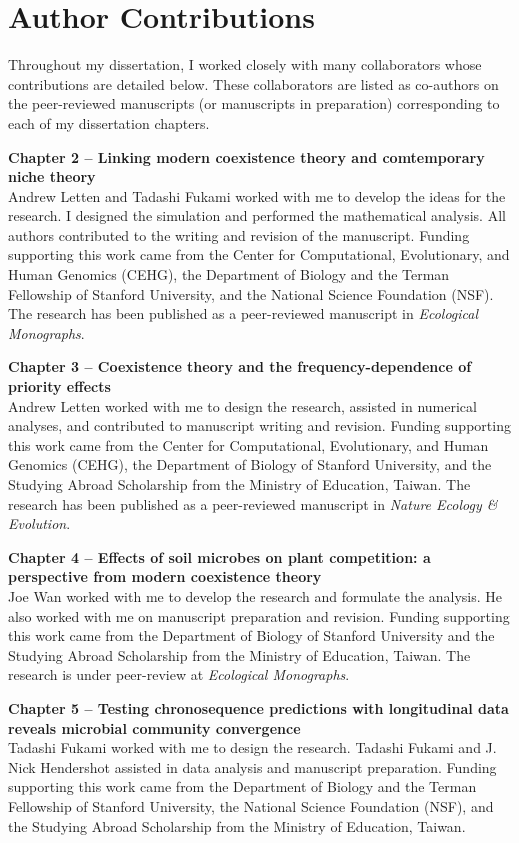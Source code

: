\section{Author Contributions}
Throughout my dissertation, I worked closely with many collaborators whose contributions are detailed below. These collaborators are listed as co-authors on the peer-reviewed manuscripts (or manuscripts in preparation) corresponding to each of my dissertation chapters.
\par


\noindent \textbf{Chapter 2 -- Linking modern coexistence theory and comtemporary niche theory}\\
\noindent Andrew Letten and Tadashi Fukami worked with me to develop the ideas for the research. I designed the simulation and performed the mathematical analysis. All authors contributed to the writing and revision of the manuscript. Funding supporting this work came from the Center for Computational, Evolutionary, and Human Genomics (CEHG), the Department of Biology and the Terman Fellowship of Stanford University, and the National Science Foundation (NSF). The research has been published as a peer-reviewed manuscript in \textit{Ecological Monographs}.
\bigskip


\noindent \textbf{Chapter 3 -- Coexistence theory and the frequency-dependence of priority effects}\\
\noindent Andrew Letten worked with me to design the research, assisted in numerical analyses, and contributed to manuscript writing and revision. Funding supporting this work came from the Center for Computational, Evolutionary, and Human Genomics (CEHG), the Department of Biology of Stanford University, and the Studying Abroad Scholarship from the Ministry of Education, Taiwan. The research has been published as a peer-reviewed manuscript in \textit{Nature Ecology \& Evolution}.
\bigskip


\noindent \textbf{Chapter 4 -- Effects of soil microbes on plant competition: a perspective from modern coexistence theory}\\
\noindent Joe Wan worked with me to develop the research and formulate the analysis. He also worked with me on manuscript preparation and revision. Funding supporting this work came from the Department of Biology of Stanford University and the Studying Abroad Scholarship from the Ministry of Education, Taiwan. The research is under peer-review at \textit{Ecological Monographs}.
\bigskip


\noindent \textbf{Chapter 5 -- Testing chronosequence predictions with longitudinal data reveals microbial community convergence}\\
\noindent Tadashi Fukami worked with me to design the research. Tadashi Fukami and J. Nick Hendershot assisted in data analysis and manuscript preparation. Funding supporting this work came from the Department of Biology and the Terman Fellowship of Stanford University, the National Science Foundation (NSF), and the Studying Abroad Scholarship from the Ministry of Education, Taiwan.
\bigskip


